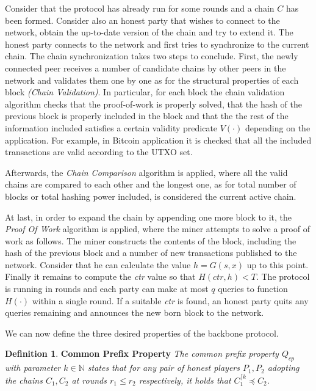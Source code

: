 \documentclass[10pt,a4paper]{article}
\theoremstyle{plain}
\theoremstyle{definition}
\newtheorem{defn}{Definition}
\theoremstyle{lemma}
\begin{document}
Consider that the protocol has already run for some rounds and a chain $C$ has been formed. Consider
also an honest party that wishes to connect to the network, obtain the up-to-date version of the
chain and try to extend it.
The honest party connects to the network and first tries to synchronize to the current chain. The
chain synchronization takes two steps to conclude. First, the newly connected peer receives a number
of candidate chains by other peers in the network and validates them one by one as for the structural 
properties of each block \textit{(Chain Validation)}. In particular, for each block the chain
validation algorithm checks that the proof-of-work is properly solved, that the hash of the previous
block is properly included in the block and that the the rest of the information included satisfies
a certain validity predicate $V(\cdot)$ depending on the application. For example, in Bitcoin
application it is checked that all the included transactions are valid according to the
UTXO set.

Afterwards, the \textit{Chain Comparison} algorithm is applied, where all the valid chains are
compared to each other and the longest one, as for total number of blocks or total hashing power
included, is considered the current active chain.

At last, in order to expand the chain by appending one more block to it, the \textit{Proof Of Work}
algorithm is applied, where the miner attempts to solve a proof of work as follows. The miner
constructs the contents of the block, including the hash of the previous block and a number of new
transactions published to the network. Consider that he can calculate the value $h = G(s,x)$ up
to this point. Finally it remains to compute the \textit{ctr} value so that $H(ctr, h) < T$. The
protocol is running in rounds and each party can make at most $q$ queries to function $H(\cdot)$
within a single round. If a suitable \textit{ctr} is found, an honest party quits any queries
remaining and announces the new born block to the network.

We can now define the three desired properties of the backbone protocol.\\
\begin{defn}{\textbf{Common Prefix Property}}
	\textit{The common prefix property $Q_{cp}$ with parameter
$k \in \mathbb{N}$ states that for any pair of honest players $P_1, P_2$ adopting the chains
$C_1, C_2$ at rounds $r_1 \leq r_2$ respectively, it holds that $C_1^{\lceil k} \preceq C_2$.}
	\label{defn:common_prefix}
\end{defn}
\end{document}
